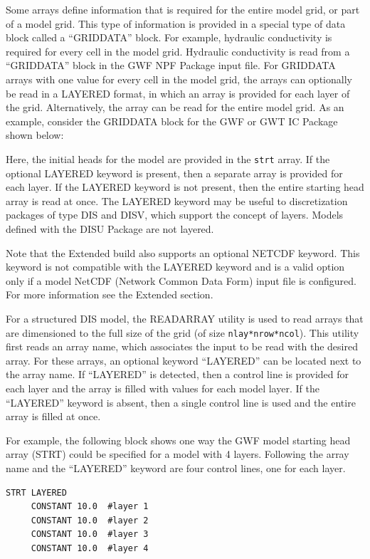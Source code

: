 Some arrays define information that is required for the entire model grid, or part of a model grid.  This type of information is provided in a special type of data block called a ``GRIDDATA'' block.  For example, hydraulic conductivity is required for every cell in the model grid.  Hydraulic conductivity is read from a ``GRIDDATA'' block in the \mf GWF NPF Package input file.  For GRIDDATA arrays with one value for every cell in the model grid, the arrays can optionally be read in a LAYERED format, in which an array is provided for each layer of the grid.  Alternatively, the array can be read for the entire model grid.  As an example, consider the GRIDDATA block for the \mf GWF or GWT IC Package shown below:



Here, the initial heads for the model are provided in the \texttt{strt} array.  If the optional LAYERED keyword is present, then a separate array is provided for each layer.  If the LAYERED keyword is not present, then the entire starting head array is read at once.  The LAYERED keyword may be useful to discretization packages of type DIS and DISV, which support the concept of layers.  Models defined with the DISU Package are not layered.

Note that the \mf Extended build also supports an optional NETCDF keyword.  This keyword is not compatible with the LAYERED keyword and is a valid option only if a model NetCDF (Network Common Data Form) input file is configured.  For more information see the Extended \mf section.

For a structured DIS model, the READARRAY utility is used to read arrays that are dimensioned to the full size of the grid (of size \texttt{nlay*nrow*ncol}). This utility first reads an array name, which associates the input to be read with the desired array.  For these arrays, an optional keyword ``LAYERED'' can be located next to the array name.  If ``LAYERED'' is detected, then a control line is provided for each layer and the array is filled with values for each model layer.  If the ``LAYERED'' keyword is absent, then a single control line is used and the entire array is filled at once.

For example, the following block shows one way the \mf GWF model starting head array (STRT) could be specified for a model with 4 layers.  Following the array name and the ``LAYERED'' keyword are four control lines, one for each layer.

\begin{lstlisting}[style=inputfile]
  STRT LAYERED
     CONSTANT 10.0  #layer 1
     CONSTANT 10.0  #layer 2
     CONSTANT 10.0  #layer 3
     CONSTANT 10.0  #layer 4
\end{lstlisting}

